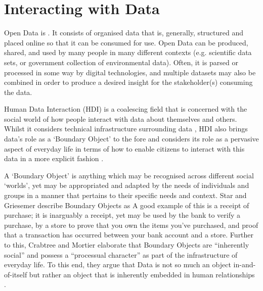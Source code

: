\section{Interacting with Data}

Open Data is  \cite{open_data_institute_what_nodate}. It consists of organised data that is, generally, structured and placed online so that it can be consumed for use. Open Data can be produced, shared, and used by many people in many different contexts (e.g. scientific data sets, or government collection of environmental data). Often, it is parsed or processed in some way by digital technologies, and multiple datasets may also be combined in order to produce a desired insight for the stakeholder(s) consuming the data.

Human Data Interaction (HDI) is a coalescing field that is concerned with the social world of how people interact with data about themselves and others. Whilst it considers technical infrastructure surrounding data \cite{mcauley_dataware_2011}, HDI also brings data's role as a `Boundary Object' \cite{star_institutional_1989} to the fore and considers its role as a pervasive aspect of everyday life in terms of how to enable citizens to interact with this data in a more explicit fashion \cite{mortier_human-data_2014}.

A `Boundary Object' is anything which may be recognised across different social `worlds', yet may be appropriated and adapted by the needs of individuals and groups in a manner that pertains to their specific needs and context. Star and Griesemer describe Boundary Objects as  \cite{star_institutional_1989} A good example of this is a receipt of purchase; it is inarguably a receipt, yet may be used by the bank to verify a purchase, by a store to prove that you own the items you've purchased, and proof that a transaction has occurred between your bank account and a store. Further to this, Crabtree and Mortier elaborate that Boundary Objects are ``inherently social'' and possess a ``processual character'' as part of the infrastructure of everyday life. To this end, they argue that Data is not so much an object in-and-of-itself but rather an object that is inherently embedded in human relationships \cite{crabtree_human_2015}.

